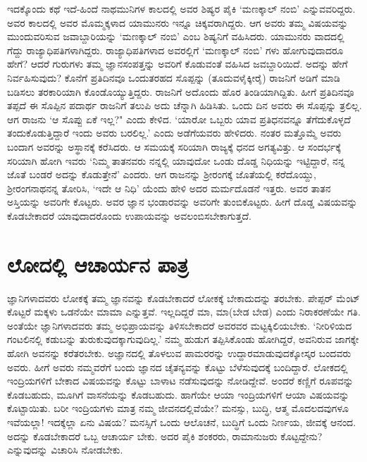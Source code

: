 ಇದಕ್ಕೊಂದು ಕಥೆ ಇದೆ-ಹಿಂದೆ ನಾಥಮುನಿಗಳ ಕಾಲದಲ್ಲಿ ಅವರ ಶಿಷ್ಯರ ಪೈಕಿ `ಮಣಕ್ಕಾಲ್ ನಂಬಿ' ಎನ್ನುವವರಿದ್ದರು. ಅವರ ಕಾಲದಲ್ಲಿ ಅವರ ಮೊಮ್ಮಕ್ಕಳಾದ ಯಾಮುನರು ಇನ್ನೂ ಚಿಕ್ಕವರಾಗಿದ್ದರು. ಆಗ ಅವರು ತಮ್ಮ ವಿಷಯವನ್ನು  ಮುಂದುವರಿಸುವ  ಜವಾಬ್ದಾರಿಯನ್ನು `ಮಣಕ್ಕಾಲ್ ನಂಬಿ' ಎಂಬ ಶಿಷ್ಯನಿಗೆ ವಹಿಸಿದರು. ಯಾಮುನರು ವಾದದಲ್ಲಿ ಗೆದ್ದು ರಾಜ್ಯಾಧಿಪತಿಗಳಾಗಿದ್ದರು. ರಾಜ್ಯಾಧಿಪತಿಗಳಾದ ಅವರಲ್ಲಿಗೆ `ಮಣಕ್ಕಾಲ್ ನಂಬಿ' ಗಳು ಹೋಗುವುದಾದರೂ ಹೇಗೆ? ಆದರೆ ಗುರುಗಳು ತಮ್ಮ ಜ್ಞಾನಸಂಪತ್ತನ್ನು ಅವರಿಗೆ ಕೊಡುವಂತೆ ವಹಿಸಿದ ಜವಬ್ದಾರಿಯಿದೆ. ಅದನ್ನು ಹೇಗೆ ನಿರ್ವಹಿಸುವುದು? ಕೊನೆಗೆ ಪ್ರತಿದಿನವೂ ಒಂದುತರಹದ ಸೊಪ್ಪನ್ನು  (ತೂದುವಳೈಕ್ಕೀರೈ) ರಾಜನಿಗೆ ಅಡಿಗೆ ಮಾಡಿ ಬಡಿಸಲು ತರಕಾರಿಯಾಗಿ ಕೊಂಡೊಯ್ಯುತ್ತಿದ್ದರು. ರಾಜನಿಗೆ ಅದೊಂದು ಹೊರ ತಿಂಡಿಯಾಗಿದ್ದಿತು. ಹೀಗೆ ಪ್ರತಿದಿನವೂ ತಪ್ಪದೆ ಈ ಸೊಪ್ಪಿನ ಪದಾರ್ಥ ರಾಜನಿಗೆ ತಲುಪಿ ಅದು ಚೆನ್ನಾಗಿ ಹಿಡಿಸಿತು. ಒಂದು ದಿನ ಅವರು ಈ ಸೊಪ್ಪನ್ನು ತ್ರಲಿಲ್ಲ. ಆಗ ರಾಜನು `ಆ ಸೊಪ್ಪು  ಏಕೆ ಇಲ್ಲ?" ಎಂದು ಕೇಳಿದ. `ಯಾರೋ ಒಬ್ಬರು ಯಾವ ಪ್ರತಿಧನವನ್ನೂ ತೆಗೆದುಕೊಳ್ಳದೆ ತಂದುಕೊಡುತ್ತಿದ್ದಾರೆ ಇಂದು ಅವರು ಬರಲಿಲ್ಲ.' ಎಂದು ಅಡೆಗೆಯವರು ಹೇಳಿದರು. ನಂತರ ಮತ್ತೊಮ್ಮೆ ಅವರು ಬಂದಾಗ ಅವರನ್ನು ಅಸ್ಥಾನಕ್ಕೆ ಕರೆಸಿದರು. ಆ ಸಮಯಕ್ಕೆ ಸರಿಯಾಗಿ ರಾಜ್ಯಕ್ಕೆ ಧನದ ಅಗತ್ಯವಿತ್ತು. ಆ ಸಂದರ್ಭಕ್ಕೆ ಸರಿಯಾಗಿ ಹೋಗಿ ಇವರು `ನಿಮ್ಮ ತಾತನವರು ನನ್ನಲ್ಲಿ ಯಾವುದೋ ಒಂಡು ದೊಡ್ಡ ನಿಧಿಯನ್ನು ಇಟ್ಟಿದ್ದಾರೆ, ನನ್ನ ಜೊತೆ ಬಂಡರೆ ಅದನ್ನು ಕೊಡುತ್ತೇನೆ' ಎಂದರು. ಆಗ ರಾಜನನ್ನು ಶ್ರೀರಂಗಕ್ಕೆ  ಜೊತೆಯಲ್ಲಿ ಕರೆದೊಯ್ದು, ಶ್ರೀರಂಗನಾಥನನ್ನ ತೋರಿಸಿ, `ಇದೇ ಆ ನಿಧಿ' ಯೆಂದು ಹೇಳಿ ಅದರ ಮರ್ಮದೊಡನೆ ಇತ್ತರು. ಅವರ ತಾತನ ಅಸ್ತಿಯನ್ನು ಅವರಿಗೇ ಕೊಟ್ಟರು. ಅವರ ಜ್ಞಾನ ಭಂಡಾರವನ್ನು ಅವರಿಗೇ ತುಂಬಿಕೊಟ್ಟರು. ಹೀಗೆ ದೊಡ್ಡ ವಿಷಯವನ್ನು ಕೊಡಬೇಕಾದರೆ ಯಾವುದಾದರೊಂದು ಉಪಾಯವನ್ನು ಅವಲಂಬಿಸಬೇಕಾಗುತ್ತದೆ.

\section*{ಲೋದಲ್ಲಿ ಆಚಾರ್ಯನ ಪಾತ್ರ}

ಜ್ಞಾನಿಗಳಾದವರು ಲೋಕಕ್ಕೆ ತಮ್ಮ ಜ್ಞಾನವನ್ನು ಕೊಡಬೇಕಾದರೆ ಲೋಕಕ್ಕೆ ಬೇಕಾದುದನ್ನು ತರಬೇಕು. ಪೇಪ್ಪರ್ ಮೆಂಟ್ ಕೊಟ್ಟರೆ ಮಕ್ಕಳು ಒಡನೆಯೇ ಮಾಮಾ ಎನ್ನುತ್ತವೆ. ಇಲ್ಲದಿದ್ದರೆ ಮಾ, ಮಾ(ಬೇಡ ಬೇಡ) ಎಂದು ನಿರಾಕರಣೆಯೇ ಗತಿ. ಅಂತೆಯೇ ಜ್ಞಾನಿಗಳಾದವರು ತಮ್ಮ ಅಭಿಪ್ರಾಯವನ್ನು ತಿಳಿಸಬೇಕಾದರೆ ಅವರವರ ಮಟ್ಟಕ್ಕಿಲಿಯಬೇಕು. `ನೀರಿಳಿಯದ ಗಂಟಲಿನಲ್ಲಿ ಕಡುಬನ್ನು ತುರುಕುವುದಕ್ಕಾಗುವುದಿಲ್ಲ.' ನಮ್ಮ ಹುಡುಗ ತಪ್ಪಿಸಿಕೊಂಡು ಹೋಗಿದ್ದರೆ, ಅವನಿರುವ ಜಾಗಕ್ಕೇ ಹೋಗಿ ಅವನನ್ನು ಕರೆತರಬೇಕು. ಅಜ್ಞಾನದಲ್ಲಿ ತೊಳಲುವ ಪಾಮರರನ್ನು ಉದ್ದಾರಮಾಡುವುದಕ್ಕೋಸ್ಕರ ಬಂದವರು ಅವರು. ಹೀಗೆ ಅವರು ನಮ್ಮವರೆಗೆ ಬಂದು ಜ್ಞಾನದ ಚೈತನ್ಯವನ್ನು ಕೊಟ್ಟು ಬೆಳೆಸುವುದಕ್ಕೆ ಬಂದಿದ್ದಾರೆ. ಲೋಕದಲ್ಲಿ ಇಂದ್ರಿಯಗಳಿಗೆ ಬೇಕಾದ ವಿಷಯವನ್ನು ಕೊಟ್ಟು ಬಾಳಾಟ ನಡೆಸುವುದನ್ನು ನೋಡಿದ್ದೇವೆ. ಅಂದರೆ ಕಣ್ಣಿಗೆ ರೂಪವನ್ನು ಕೊಡಬಹುದು, ಮೂಗಿಗೆ ವಾಸನೆಯನ್ನು ಕೊಡಬಹುದು. ಹಾಗೆಯೇ ಆಯಾ ಇಂದ್ರಿಯಗಳಿಗೆ ಆಯಾ ವಿಷಯವನ್ನು  ಕೊಟ್ಟಾಯಿತು. ಬರೀ ಇಂದ್ರಿಯಗಳು ಮಾತ್ರ ನಮ್ಮ ಜೀವನದಲ್ಲಿವೆಯೇ? ಮನಸ್ಸು, ಬುದ್ಧಿ, ಆತ್ಮ ಮೊದಲದವುಗಳೂ ಇವೆಯಲ್ಲಾ! ಇದಕ್ಕೆಲ್ಲಾ ಏನು ವಿಷಯ? ಮನಸ್ಸಿಗೆ ಒಂದು ಆಲೊಚನೆ, ಬುದ್ಧಿಗೆ ಒಂದು ನಿರ್ಣಯ, ಜೀವಕ್ಕೆ ಆನಂದ. ಅದನ್ನು ಕೊಡಬೇಕಾದರೆ ಒಬ್ಬ ಆಚಾರ್ಯ ಬೇಕು. ಅದರ ಪೈಕಿ ಶಂಕರರು, ರಾಮಾನುಜರು ಕೊಟ್ಟದ್ದೇನು? ಎನ್ನುವುದನ್ನು ವಿಚಾರಿಸಿ ನೋಡಬೇಕು. 

